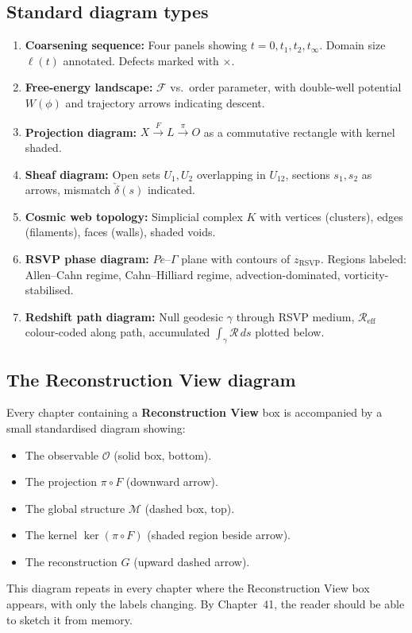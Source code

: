 \subsection*{Standard diagram types}

\begin{enumerate}[leftmargin=2em]
  \item \textbf{Coarsening sequence:}
    Four panels showing $t = 0, t_1, t_2, t_\infty$.
    Domain size $\ell(t)$ annotated.
    Defects marked with $\times$.
  \item \textbf{Free-energy landscape:}
    $\mathcal{F}$ vs.\ order parameter, with double-well
    potential $W(\phi)$ and trajectory arrows indicating descent.
  \item \textbf{Projection diagram:}
    $X \xrightarrow{F} L \xrightarrow{\pi} O$ as a commutative
    rectangle with kernel shaded.
  \item \textbf{Sheaf diagram:}
    Open sets $U_1, U_2$ overlapping in $U_{12}$,
    sections $s_1, s_2$ as arrows, mismatch
    $\check{\delta}(s)$ indicated.
  \item \textbf{Cosmic web topology:}
    Simplicial complex $K$ with vertices (clusters),
    edges (filaments), faces (walls), shaded voids.
  \item \textbf{RSVP phase diagram:}
    $Pe$--$\Gamma$ plane with contours of $z_{\mathrm{RSVP}}$.
    Regions labeled: Allen--Cahn regime, Cahn--Hilliard regime,
    advection-dominated, vorticity-stabilised.
  \item \textbf{Redshift path diagram:}
    Null geodesic $\gamma$ through RSVP medium,
    $\mathcal{R}_{\mathrm{eff}}$ colour-coded along path,
    accumulated $\int_\gamma\mathcal{R}\,ds$ plotted below.
\end{enumerate}

\subsection*{The Reconstruction View diagram}

Every chapter containing a \textbf{Reconstruction View} box
is accompanied by a small standardised diagram showing:
\begin{itemize}[leftmargin=2em]
  \item The observable $\mathcal{O}$ (solid box, bottom).
  \item The projection $\pi \circ F$ (downward arrow).
  \item The global structure $\mathcal{M}$ (dashed box, top).
  \item The kernel $\ker(\pi \circ F)$ (shaded region beside arrow).
  \item The reconstruction $G$ (upward dashed arrow).
\end{itemize}

This diagram repeats in every chapter where the Reconstruction
View box appears, with only the labels changing.
By Chapter~41, the reader should be able to sketch it from memory.
